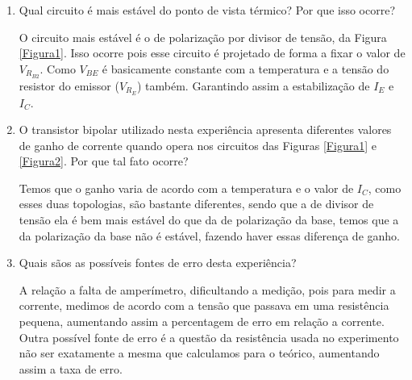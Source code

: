 \begin{enumerate}
	\item Qual circuito é mais estável do ponto de vista térmico? Por que isso ocorre?
	
	O circuito mais estável é o de polarização por divisor de tensão, da Figura \ref{Figura1}. Isso ocorre pois esse circuito é projetado de forma a fixar o valor de $ V_{R_{B2}} $. Como $ V_{BE} $ é basicamente constante com a temperatura e a tensão do resistor do emissor ($ V_R_E $) também. Garantindo assim a estabilização de $ I_E $ e $ I_C $.
	
	
	\item O transistor bipolar utilizado nesta experiência apresenta diferentes valores de ganho de corrente quando opera nos circuitos das Figuras \ref{Figura1} e \ref{Figura2}. Por que tal fato ocorre?
	
	Temos que o ganho varia de acordo com a temperatura e o valor de $ I_C $, como esses duas topologias, são bastante diferentes, sendo que a de divisor de tensão ela é bem mais estável do que da de polarização da base, temos que a da polarização da base não é estável, fazendo haver essas diferença de ganho.
	
	\item Quais sãos as possíveis fontes de erro desta experiência?
	
	A relação a falta de amperímetro, dificultando a medição, pois para medir a corrente, medimos de acordo com a tensão que passava em uma resistência pequena, aumentando assim a percentagem de erro em relação a corrente. Outra possível fonte de erro é a questão da resistência usada no experimento não ser exatamente a mesma que calculamos para o teórico, aumentando assim a taxa de erro. 
	
	
\end{enumerate}